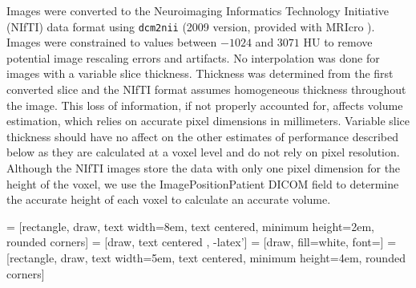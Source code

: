 Images were converted to the Neuroimaging Informatics Technology Initiative (NIfTI) data format using \texttt{dcm2nii} (2009 version, provided with MRIcro \citep{rorden_stereotaxic_2000}).  Images were constrained to values between $-1024$ and $3071$ HU to remove potential image rescaling errors and artifacts.  No interpolation was done for images with a variable slice thickness. Thickness was determined from the first converted slice and the NIfTI format assumes homogeneous thickness throughout the image.  This loss of information, if not properly accounted for, affects volume estimation, which relies on accurate pixel dimensions in millimeters.  Variable slice thickness should have no affect on the other estimates of performance described below as they are calculated at a voxel level and do not rely on pixel resolution.  Although the NIfTI images store the data with only one pixel dimension for the height of the voxel, we use the ImagePositionPatient DICOM field to determine the accurate height of each voxel to calculate an accurate volume.  


 = [rectangle, draw, text width=8em, text centered, minimum height=2em, rounded corners]
 = [draw, text centered , -latex']
 = [draw, fill=white, font=\tiny ]
 = [rectangle, draw, text width=5em, text centered, minimum height=4em, rounded corners]    


